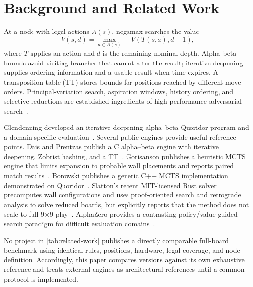 \section{Background and Related Work}
At a node with legal actions $A(s)$, negamax searches the value
\begin{equation}
V(s,d)=\max_{a\in A(s)}-V(T(s,a),d-1),
\end{equation}
where $T$ applies an action and $d$ is the remaining nominal depth. Alpha--beta bounds avoid visiting branches that cannot alter the result; iterative deepening supplies ordering information and a usable result when time expires. A transposition table (TT) stores bounds for positions reached by different move orders. Principal-variation search, aspiration windows, history ordering, and selective reductions are established ingredients of high-performance adversarial search~\cite{stockfishSearch,stockfishTT}.

Glendenning developed an iterative-deepening alpha--beta Quoridor program and a domain-specific evaluation~\cite{glendenning2005}. Several public engines provide useful reference points. Dais and Prentzas publish a C alpha--beta engine with iterative deepening, Zobrist hashing, and a TT~\cite{dais2023}. Gorisanson publishes a heuristic MCTS engine that limits expansion to probable wall placements and reports paired match results~\cite{gorisanson2024}. Borowski publishes a generic C++ MCTS implementation demonstrated on Quoridor~\cite{borowski2021}. Slatton's recent MIT-licensed Rust solver precomputes wall configurations and uses proof-oriented search and retrograde analysis to solve reduced boards, but explicitly reports that the method does not scale to full 9$\times$9 play~\cite{slatton2026article,slatton2026solver}. AlphaZero provides a contrasting policy/value-guided search paradigm for difficult evaluation domains~\cite{silver2017}.



No project in \cref{tab:related-work} publishes a directly comparable full-board benchmark using identical rules, positions, hardware, legal coverage, and node definition. Accordingly, this paper compares \walwuk{} versions against its own exhaustive reference and treats external engines as architectural references until a common protocol is implemented.

